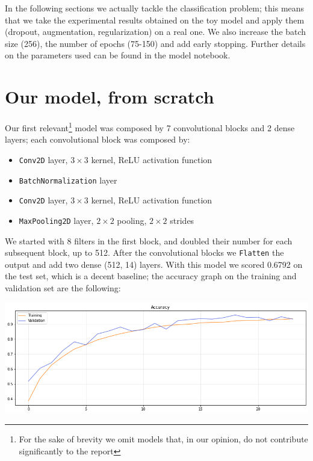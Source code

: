 \documentclass[10.5pt,a4paper,twocolumn]{article}
\begin{document}
In the following sections we actually tackle the classification problem; this means that we take the experimental results obtained on the toy model
and apply them (dropout, augmentation, regularization) on a real one. We also increase the batch size (256), the number of epochs (75-150) and add early stopping. 
Further details on the parameters used can be found in the model notebook.

\section{Our model, from scratch}
\label{sec:our_model}
Our first relevant\footnote{For the sake of brevity we omit models that, in our opinion, do not contribute significantly to the report} model was composed by 7 convolutional blocks and 2 dense layers; each convolutional block was composed by:
\begin{itemize}
    \item \texttt{Conv2D} layer, $3\times 3$ kernel, ReLU activation function
    \item \texttt{BatchNormalization} layer
    \item \texttt{Conv2D} layer, $3\times 3$ kernel, ReLU activation function
    \item \texttt{MaxPooling2D} layer, $2\times 2$ pooling, $2\times 2$ strides
\end{itemize}
We started with 8 filters in the first block, and doubled their number for each subsequent block, up to 512.
After the convolutional blocks we \texttt{Flatten} the output and add two dense (512, 14) layers.
With this model we scored 0.6792 on the test set, which is a decent baseline; the accuracy graph on the training and validation set are the following:
\begin{minipage}{0.5\textwidth}
    \includegraphics[width=\textwidth]{../graphs/accuracy/06_8conv2dense.png}
\end{minipage}
\end{document}
